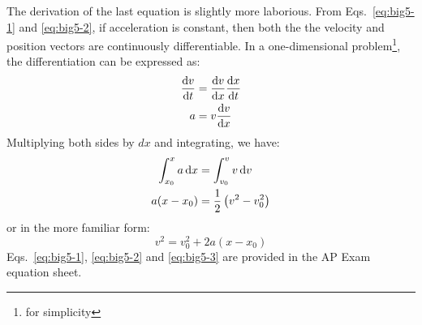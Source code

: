 \documentclass{../../oss-handout}
\begin{document}
The derivation of the last equation is slightly more laborious. From
Eqs.~\ref{eq:big5-1} and \ref{eq:big5-2}, if acceleration is constant, then
both the the velocity and position vectors are continuously differentiable. In
a one-dimensional problem\footnote{for simplicity}, the differentiation can be
expressed as:
\begin{align*}
  \diff vt&=\diff vx\diff xt\\
  a&=v\diff vx
\end{align*}
Multiplying both sides by $dx$ and integrating, we have:
\begin{align*}
  \int_{x_0}^x a\dl x&=\int_{v_0}^v v\dl v\\
  a(x-x_0)&=\frac12\left(v^2-v_0^2\right)
\end{align*}
or in the more familiar form:
\begin{equation}
  \boxed{v^2 = v_0^2+ 2a(x-x_0)}
  \label{eq:big5-3}
\end{equation}
Eqs.~\ref{eq:big5-1}, \ref{eq:big5-2} and \ref{eq:big5-3} are provided in the
AP Exam equation sheet.
%  
%
\end{document}
